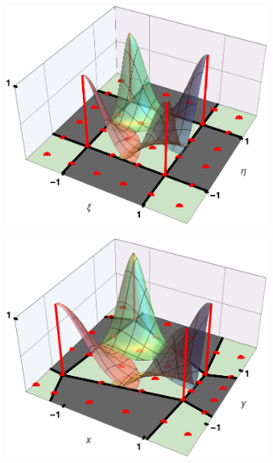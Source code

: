 \begin{figure}[ht]
   \centering
   \begin{subfigure}[b]{0.44\textwidth}
      \centering
      \includegraphics[width=0.94\textwidth]{Slike/elmFuncs3d}
      \vspace{0mm}
      \caption{}
   \end{subfigure}
   \hspace{3mm}
   \begin{subfigure}[b]{0.45\textwidth}
      \centering
      \includegraphics[width=0.94\textwidth]{Slike/elmFuncs3dTrans}
      \caption{}
   \end{subfigure}
   \caption{}
   \label{fig:shapeFs}
\end{figure}


